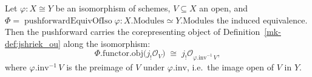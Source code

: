 \begin{lemma}
  \label{mk-lem:jshriek_transport_along_iso}

  Let \(\varphi : X \cong Y\) be an isomorphism of schemes, \(V \subseteq X\) an open, and
  \(\Phi = \operatorname{pushforwardEquivOfIso}\varphi : X.\mathrm{Modules} \simeq Y.\mathrm{Modules}\)
  the induced equivalence. Then the pushforward carries the corepresenting object of
  Definition~\ref{mk-def:jshriek_ou} along the isomorphism:
  \[
    \Phi.\mathrm{functor}.\mathrm{obj}\bigl(j_!\mathcal{O}_V\bigr)
      \;\cong\;
    j_!\mathcal{O}_{\varphi.\mathrm{inv}^{-1}\,V},
  \]
  where \(\varphi.\mathrm{inv}^{-1}\,V\) is the preimage of \(V\) under \(\varphi.\mathrm{inv}\), i.e.\
  the image open of \(V\) in \(Y\).
\end{lemma}
